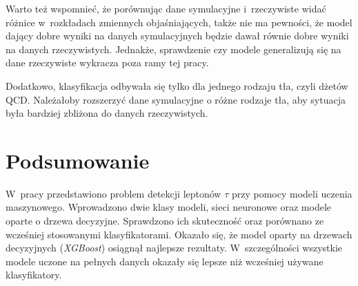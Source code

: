 \documentclass{pracalicmgr}
\begin{document}
	Warto też wspomnieć, że porównując dane symulacyjne i~rzeczywiste widać różnice w~rozkładach zmiennych objaśniających, także nie ma pewności, że model dający dobre wyniki na danych symulacyjnych będzie dawał równie dobre wyniki na danych rzeczywistych. Jednakże, sprawdzenie czy modele generalizują się na dane rzeczywiste wykracza poza ramy tej pracy.
	
	Dodatkowo, klasyfikacja odbywała się tylko dla jednego rodzaju tła, czyli dżetów QCD. Należałoby rozszerzyć dane symulacyjne o różne rodzaje tła, aby sytuacja była bardziej zbliżona do danych rzeczywistych.
	
    \chapter{Podsumowanie}
    
	W~pracy przedstawiono problem detekcji leptonów $\tau$ przy pomocy modeli uczenia maszynowego. Wprowadzono dwie klasy modeli, sieci neuronowe oraz modele oparte o drzewa decyzyjne. Sprawdzono ich skuteczność oraz porównano ze wcześniej stosowanymi klasyfikatorami. Okazało się, że model oparty na drzewach decyzyjnych (\textit{XGBoost}) osiągnął najlepsze rezultaty. W~szczególności wszystkie modele uczone na pełnych danych okazały się lepsze niż wcześniej używane klasyfikatory.
    
    \printbibliography
    
\end{document}
